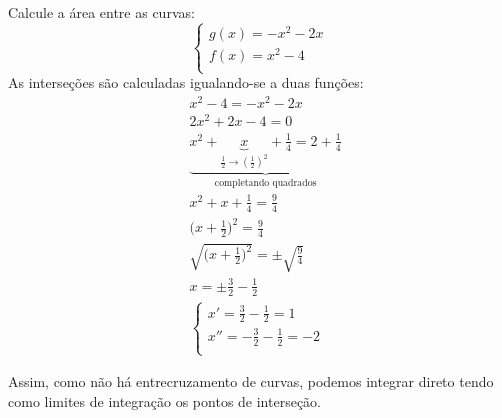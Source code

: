 \begin{exercicio}
  Calcule a área entre as curvas:
  \[
    \begin{cases*}
    g(x)=-x^2-2x\\%
    f(x)=x^2-4 \\%
        \end{cases*}
  \]    
As interseções são calculadas igualando-se a duas funções:
\begin{align*}
  &x^2-4=-x^2-2x\\
  &2x^2+2x-4=0\\
  &\underbrace{x^2+\underbrace{x}_{\frac{1}{2}\rightarrow {(\frac{1}{2})^2}}+\frac{1}{4}=2+\frac{1}{4}}_{\text{completando quadrados}}\\
  &x^2+x+\frac{1}{4}=\frac{9}{4}\\
  &\Big(x+\frac{1}{2}\Big)^2=\frac{9}{4}\\
  &\sqrt{\Big(x+\frac{1}{2}\Big)^2}=\pm \sqrt{\frac{9}{4}}\\
  &x=\pm\frac{3}{2}-\frac{1}{2}\\
  & \begin{cases*}
        x'=\frac{3}{2}-\frac{1}{2}=1\\
        x''=-\frac{3}{2}-\frac{1}{2}=-2\\
    \end{cases*}
  \end{align*}

  \begin{figure}[H]
  \centering
\end{figure}

Assim, como não há entrecruzamento de curvas, podemos integrar direto tendo como limites de integração os pontos de interseção.


\end{exercicio}
